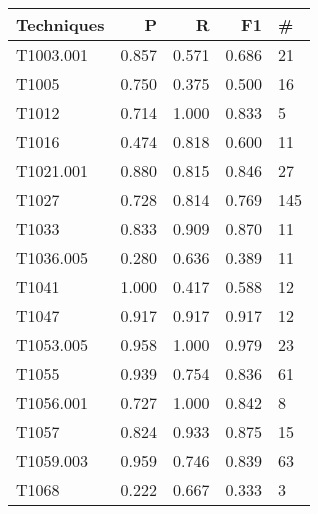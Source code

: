 \begin{tabular}[t]{lrrrl|}
    \toprule
    Techniques & P     & R     & F1    & \#  \\
    \midrule
    T1003.001  & 0.857 & 0.571 & 0.686 & 21  \\
    T1005      & 0.750 & 0.375 & 0.500 & 16  \\
    T1012      & 0.714 & 1.000 & 0.833 & 5   \\
    T1016      & 0.474 & 0.818 & 0.600 & 11  \\
    T1021.001  & 0.880 & 0.815 & 0.846 & 27  \\
    T1027      & 0.728 & 0.814 & 0.769 & 145 \\
    T1033      & 0.833 & 0.909 & 0.870 & 11  \\
    T1036.005  & 0.280 & 0.636 & 0.389 & 11  \\
    T1041      & 1.000 & 0.417 & 0.588 & 12  \\
    T1047      & 0.917 & 0.917 & 0.917 & 12  \\
    T1053.005  & 0.958 & 1.000 & 0.979 & 23  \\
    T1055      & 0.939 & 0.754 & 0.836 & 61  \\
    T1056.001  & 0.727 & 1.000 & 0.842 & 8   \\
    T1057      & 0.824 & 0.933 & 0.875 & 15  \\
    T1059.003  & 0.959 & 0.746 & 0.839 & 63  \\
    T1068      & 0.222 & 0.667 & 0.333 & 3   \\
    \end{tabular}
